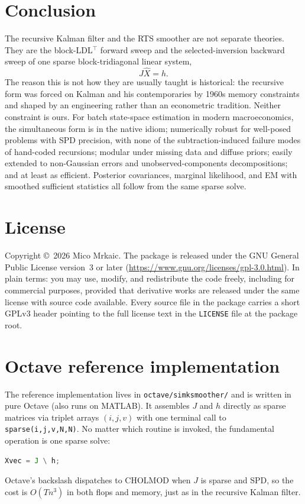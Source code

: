 \documentclass[11pt]{article}
\begin{document}
\section{Conclusion}

The recursive Kalman filter and the RTS smoother are not separate
theories.  They are the block-LDL$^\top$ forward sweep and the
selected-inversion backward sweep of one sparse block-tridiagonal
linear system,
\begin{equation*}
J\widehat X=h.
\end{equation*}
The reason this is not how they are usually taught is historical: the
recursive form was forced on Kalman and his contemporaries by 1960s
memory constraints and shaped by an engineering rather than an
econometric tradition.  Neither constraint is ours.  For batch
state-space estimation in modern macroeconomics, the simultaneous form
is in the native idiom; numerically robust for well-posed problems with
SPD precision, with none of the subtraction-induced failure modes of
hand-coded recursions; modular under missing data and diffuse priors;
easily extended to non-Gaussian errors and unobserved-components
decompositions; and at least as efficient.
Posterior covariances, marginal likelihood, and EM with smoothed
sufficient statistics all follow from the same sparse solve.

\clearpage
\appendix

\section*{License}

Copyright \copyright\ 2026 Mico Mrkaic.  The package is released under
the GNU General Public License version~3 or later
(\url{https://www.gnu.org/licenses/gpl-3.0.html}).  In plain
terms: you may use, modify, and redistribute the code freely, including
for commercial purposes, provided that derivative works are released
under the same license with source code available.  Every source file
in the package carries a short GPLv3 header pointing to the full
license text in the \texttt{LICENSE} file at the package root.

\section{Octave reference implementation}
\label{sec:octave-impl}

The reference implementation lives in \texttt{octave/simksmoother/}
and is written in pure Octave (also runs on MATLAB).  It assembles
$J$ and $h$ directly as sparse matrices via triplet arrays $(i,j,v)$
with one terminal call to \texttt{sparse(i,j,v,N,N)}.  No matter which
routine is invoked, the fundamental operation is one sparse solve:
\begin{lstlisting}[language=Octave]
Xvec = J \ h;
\end{lstlisting}
Octave's backslash dispatches to CHOLMOD when $J$ is sparse and SPD,
so the cost is $O(Tn^3)$ in both flops and memory, just as in the
recursive Kalman filter.
\end{document}
